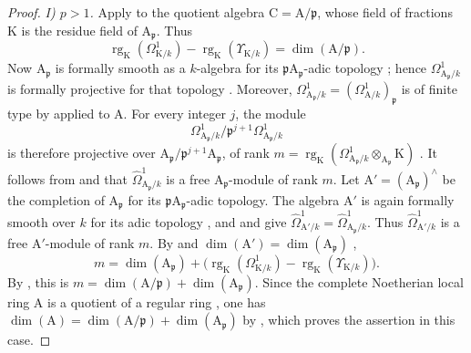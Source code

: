 \begin{proof}
\emph{I) $p>1$.} Apply  to the quotient algebra $\mathrm{C}=\mathrm{A}/\mathfrak{p}$, whose field of fractions $\mathrm{K}$ is the residue field of $\mathrm{A}_{\mathfrak{p}}$. Thus
\begin{equation}
\label{IV.18.11.3.1}
\tag{18.11.3.1}
  \operatorname{rg}_{\mathrm{K}}(\Omega^1_{\mathrm{K}/k})-
  \operatorname{rg}_{\mathrm{K}}(\Upsilon_{\mathrm{K}/k})=\dim(\mathrm{A}/\mathfrak{p}).
\end{equation}
Now $\mathrm{A}_{\mathfrak{p}}$ is formally smooth as a $k$-algebra for its $\mathfrak{p}\mathrm{A}_{\mathfrak{p}}$-adic topology ; hence $\Omega^1_{\mathrm{A}_{\mathfrak{p}}/k}$ is formally projective  for that topology . Moreover,
$\Omega^1_{\mathrm{A}_{\mathfrak{p}}/k}=(\Omega^1_{\mathrm{A}/k})_{\mathfrak{p}}$  is of finite type by  applied to $\mathrm{A}$. For every integer $j$, the module
\[
  \Omega^1_{\mathrm{A}_{\mathfrak{p}}/k}/\mathfrak{p}^{j+1}\Omega^1_{\mathrm{A}_{\mathfrak{p}}/k}
\]
is therefore projective over $\mathrm{A}_{\mathfrak{p}}/\mathfrak{p}^{j+1}\mathrm{A}_{\mathfrak{p}}$, of rank
$m=\operatorname{rg}_{\mathrm{K}}(\Omega^1_{\mathrm{A}_{\mathfrak{p}}/k}\otimes_{\mathrm{A}_{\mathfrak{p}}}\mathrm{K})$ . It follows from  and  that $\hat{\Omega}^1_{\mathrm{A}_{\mathfrak{p}}/k}$ is a free $\mathrm{A}_{\mathfrak{p}}$-module of rank $m$. Let $\mathrm{A}'=(\mathrm{A}_{\mathfrak{p}})^{\wedge}$ be the completion of $\mathrm{A}_{\mathfrak{p}}$ for its $\mathfrak{p}\mathrm{A}_{\mathfrak{p}}$-adic topology. The algebra $\mathrm{A}'$ is again formally smooth over $k$ for its adic topology , and  and  give $\hat{\Omega}^1_{\mathrm{A}'/k}=\hat{\Omega}^1_{\mathrm{A}_{\mathfrak{p}}/k}$. Thus $\hat{\Omega}^1_{\mathrm{A}'/k}$ is a free $\mathrm{A}'$-module of rank $m$. By  and $\dim(\mathrm{A}')=\dim(\mathrm{A}_{\mathfrak{p}})$ ,
\begin{equation}
\label{IV.18.11.3.2}
\tag{18.11.3.2}
  m=\dim(\mathrm{A}_{\mathfrak{p}})+
  \bigl(\operatorname{rg}_{\mathrm{K}}(\Omega^1_{\mathrm{K}/k})-
  \operatorname{rg}_{\mathrm{K}}(\Upsilon_{\mathrm{K}/k})\bigr).
\end{equation}
By , this is $m=\dim(\mathrm{A}/\mathfrak{p})+\dim(\mathrm{A}_{\mathfrak{p}})$. Since the complete Noetherian local ring $\mathrm{A}$ is a quotient of a regular ring , one has
$\dim(\mathrm{A})=\dim(\mathrm{A}/\mathfrak{p})+\dim(\mathrm{A}_{\mathfrak{p}})$ by , which proves the assertion in this case.


\end{proof}
